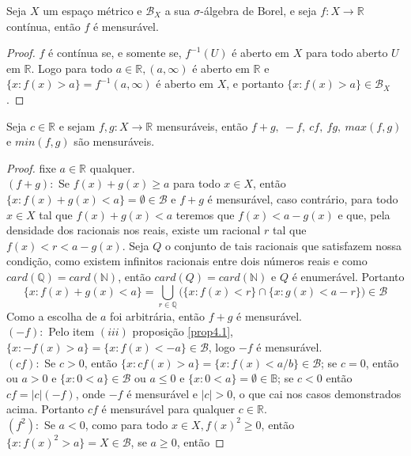 \begin{proposicao}
    Seja $X$ um espaço métrico e $\mathcal{B}_X$ a sua $\sigma$-álgebra de Borel, e seja $f: X \to \mathbb{R}$ contínua, então $f$ é mensurável.
    \begin{proof}
        $f$ é contínua se, e somente se, $f^{-1}(U)$ é aberto em $X$ para todo aberto $U$ em $\mathbb{R}$. Logo para todo $a \in \mathbb{R}, (a,\infty)$ é aberto em $\mathbb{R}$ e $\{x:f(x)>a\} = f^{-1}(a,\infty)$ é aberto em $X$, e portanto $\{x:f(x)>a\} \in \mathcal{B}_X$.
    \end{proof}
\end{proposicao}

\begin{proposicao} \label{prop4.4}
    Seja $c \in \mathbb{R}$ e sejam $f,g: X \to \mathbb{R}$ mensuráveis, então $f+g, \ -f, \ cf, \ fg, \ max(f,g)$ e $min(f,g)$ são mensuráveis.
    \begin{proof}
        fixe $a \in \mathbb{R}$ qualquer. \\
        $(f+g):$ Se $f(x) + g(x) \geq a$ para todo $x \in X$, então $\{x : f(x) + g(x) < a\} = \emptyset \in \mathcal{B}$ e $f+g$ é mensurável, caso contrário, para todo $x \in X$ tal que $f(x)+g(x) < a$ teremos que $f(x) < a - g(x)$ e que, pela densidade dos racionais nos reais, existe um racional $r$ tal que $f(x) < r < a - g(x)$. Seja $Q$ o conjunto de tais racionais que satisfazem nossa condição, como existem infinitos racionais entre dois números reais e como $card(\mathbb{Q})=card(\mathbb{N})$, então $card(Q)=card(\mathbb{N})$ e $Q$ é enumerável. Portanto  
        \[
        \{x: f(x)+g(x)<a\} = \bigcup_{r \in \mathbb{Q}} \big(\{x : f(x) < r\} \cap \{x : g(x) < a - r\} \big) \in \mathcal{B}    
        \]
        Como a escolha de $a$ foi arbitrária, então $f+g$ é mensurável. \\
        $(-f):$ Pelo item $(iii)$ proposição \ref{prop4.1}, $\{x: -f(x) > a\} = \{x: f(x) < -a\} \in \mathcal{B}$, logo $-f$ é mensurável. \\
        $(cf):$ Se $c>0$, então $\{x: cf(x) > a\} = \{x: f(x) < a/b \} \in \mathcal{B}$; se $c=0$, então ou $a>0$ e $\{x: 0 < a\} \in \mathcal{B}$ ou $a\leq 0$ e $\{x: 0 < a\} = \emptyset \in \mathbb{B}$; se $c<0$ então $cf= |c|(-f)$, onde $-f$ é mensurável e $|c|>0$, o que cai nos casos demonstrados acima. Portanto $cf$ é mensurável para qualquer $c \in \mathbb{R}$. \\
        $(f^2):$ Se $a<0$, como para todo $x \in X, f(x)^2 \geq 0$, então $\{x:f(x)^2 > a\} = X \in \mathcal{B}$, se $a \geq 0$, então 

\end{proof}
\end{proposicao}
